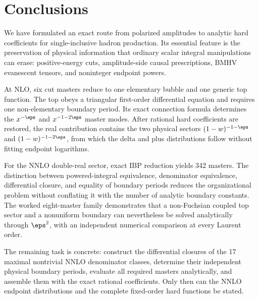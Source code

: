 \section{Conclusions}
\label{sec:conclusions}

We have formulated an exact route from polarized amplitudes to analytic hard
coefficients for single-inclusive hadron production.  Its essential feature is
the preservation of physical information that ordinary scalar integral
manipulations can erase: positive-energy cuts, amplitude-side causal
prescriptions, BMHV evanescent tensors, and noninteger endpoint powers.

At NLO, six cut masters reduce to one elementary bubble and one generic top
function.  The top obeys a triangular first-order differential equation and
requires one non-elementary boundary period.  Its exact connection formula
determines the $x^{-\eps}$ and $x^{-1-2\eps}$ master modes.  After rational
hard coefficients are restored, the real contribution contains the two
physical sectors $(1-w)^{-1-\eps}$ and
$(1-w)^{-1-2\eps}$, from which the delta and plus distributions follow
without fitting endpoint logarithms.

For the NNLO double-real sector, exact IBP reduction yields 342 masters.  The
distinction between powered-integral equivalence, denominator equivalence,
differential closure, and equality of boundary periods reduces the
organizational problem without conflating it with the number of analytic
boundary constants.  The worked eight-master family demonstrates that a
non-Fuchsian coupled top sector and a nonuniform boundary can nevertheless be
solved analytically through $\eps^2$, with an independent numerical
comparison at every Laurent order.

The remaining task is concrete: construct the differential closures of the
17 maximal nontrivial NNLO denominator classes, determine their independent
physical boundary periods, evaluate all required masters analytically, and
assemble them with the exact rational coefficients.  Only then can the NNLO
endpoint distributions and the complete fixed-order hard functions be stated.
